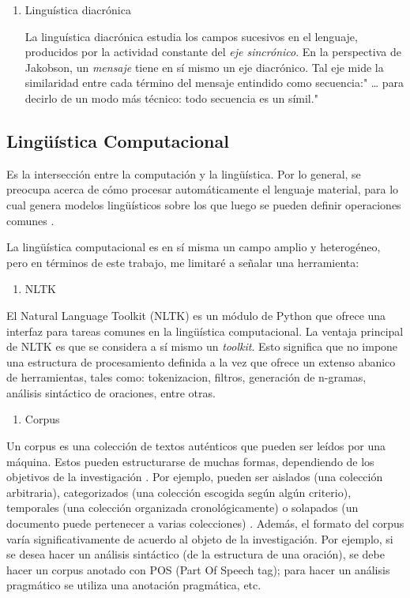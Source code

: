 \documentclass[twoside]{article}
\begin{document}
\begin{enumerate}
\item Linguística diacrónica 

La linguística diacrónica estudia los campos sucesivos en el 
lenguaje, producidos por la actividad constante del \emph{eje 
sincrónico}. En la perspectiva 
 de Jakobson, un \emph{mensaje} tiene en sí mismo un eje 
 diacrónico. Tal eje mide la similaridad entre cada
 término del mensaje entindido como secuencia:"
 \ldots{} para decirlo de un modo más técnico: todo
 secuencia es un símil."
\end{enumerate}

\subsection{Lingüística Computacional}
\label{sec:org4000502}


Es la intersección entre la computación y la lingüística. Por lo
general, se preocupa acerca de cómo procesar automáticamente el
lenguaje material, para lo cual genera modelos lingüísticos sobre los
que luego se pueden definir operaciones comunes \cite{gelbukh2004}.


La lingüística computacional es en sí misma un campo amplio y
heterogéneo, pero en términos de este trabajo, me limitaré a señalar
una herramienta:

\begin{enumerate}
\item NLTK
\end{enumerate}

El Natural Language Toolkit (NLTK) es un módulo de Python que ofrece
una interfaz para tareas comunes en la lingüística computacional. La
ventaja principal de NLTK es que se considera a sí mismo un
\emph{toolkit}. Esto significa que no impone una estructura de
procesamiento definida a la vez que ofrece un extenso abanico de
herramientas, tales como: tokenizacion, filtros, generación de
n-gramas, análisis sintáctico de oraciones, entre otras.

\begin{enumerate}
\item Corpus
\end{enumerate}


Un corpus es una colección de textos auténticos que pueden ser
leídos por una máquina. Estos pueden estructurarse de muchas
formas, dependiendo de los objetivos de la investigación
\cite{indurkhya2010handbook}. Por ejemplo, pueden ser aislados (una
colección arbitraria), categorizados (una colección escogida según
algún criterio), temporales (una colección organizada
cronológicamente) o solapados (un documento puede pertenecer a
varias colecciones) \cite{bird2009natural}. Además, el formato del
corpus varía significativamente de acuerdo al objeto de la
investigación. Por ejemplo, si se desea hacer un análisis
sintáctico (de la estructura de una oración), se debe hacer un
corpus anotado con POS (Part Of Speech tag); para hacer un análisis
pragmático se utiliza una anotación pragmática, etc.
\end{document}
